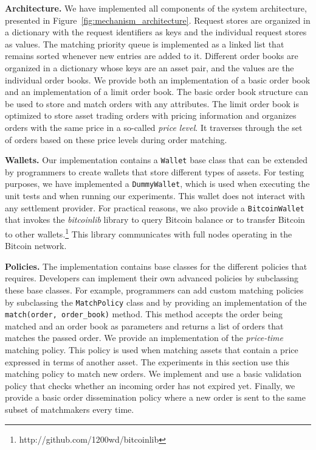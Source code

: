 \textbf{Architecture.}
We have implemented all components of the \ModelName{} system architecture, presented in Figure~\ref{fig:mechanism_architecture}.
Request stores are organized in a dictionary with the request identifiers as keys and the individual request stores as values.
The matching priority queue is implemented as a linked list that remains sorted whenever new entries are added to it.
Different order books are organized in a dictionary whose keys are an asset pair, and the values are the individual order books.
We provide both an implementation of a basic order book and an implementation of a limit order book.
The basic order book structure can be used to store and match orders with any attributes.
The limit order book is optimized to store asset trading orders with pricing information and organizes orders with the same price in a so-called \emph{price level}.
It traverses through the set of orders based on these price levels during order matching.

\textbf{Wallets.}
Our implementation contains a \texttt{Wallet} base class that can be extended by programmers to create wallets that store different types of assets.
For testing purposes, we have implemented a \texttt{DummyWallet}, which is used when executing the unit tests and when running our experiments.
This wallet does not interact with any settlement provider.
For practical reasons, we also provide a \texttt{BitcoinWallet} that invokes the \emph{bitcoinlib} library to query Bitcoin balance or to transfer Bitcoin to other wallets.\footnote{http://github.com/1200wd/bitcoinlib}
This library communicates with full nodes operating in the Bitcoin network.

\textbf{Policies.}
The implementation contains base classes for the different policies that \ModelName{} requires.
Developers can implement their own advanced policies by subclassing these base classes.
For example, programmers can add custom matching policies by subclassing the \texttt{MatchPolicy} class and by providing an implementation of the \texttt{match(order, order\_book)} method.
This method accepts the order being matched and an order book as parameters and returns a list of orders that matches the passed order.
We provide an implementation of the \emph{price-time} matching policy.
This policy is used when matching assets that contain a price expressed in terms of another asset.
The experiments in this section use this matching policy to match new orders.
We implement and use a basic validation policy that checks whether an incoming order has not expired yet.
Finally, we provide a basic order dissemination policy where a new order is sent to the same subset of matchmakers every time.


